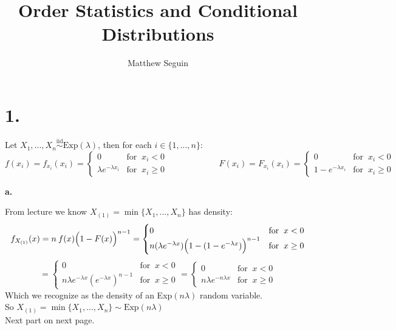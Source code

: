 \documentclass{article}
\title{Order Statistics and Conditional Distributions}
\author{Matthew Seguin}
\date{}
\begin{document}
\maketitle

\section*{1.}
\begin{center}
\doublespacing
    Let $X_1, ..., X_n\overset{\mbox{iid}}{\sim}\mbox{Exp}(\lambda)$, then for each $i\in\{1, ..., n\}$:
    \[f(x_i) = f_{x_i} (x_i) =
    \begin{cases}
        0 & \mbox{for}\;\;x_i < 0 \\
        \lambda e^{-\lambda x_i} & \mbox{for}\;\;x_i\geq 0
    \end{cases}
    \hspace{1in}
    F(x_i) = F_{x_i} (x_i) =
    \begin{cases}
        0 & \mbox{for}\;\;x_i < 0 \\
        1 - e^{-\lambda x_i} & \mbox{for}\;\;x_i\geq 0
    \end{cases}
    \]
\end{center}

{\Large\textbf{a.}}
\begin{center}
\doublespacing
    From lecture we know $X_{(1)} =\min\{X_1, ..., X_n\}$ has density:
    \[f_{X_{(1)}} (x) = n\:f(x)\Big{(}1 - F(x)\Big{)}^{n-1} =
    \begin{cases}
        0 & \mbox{for}\;\;x < 0 \\
        n(\lambda e^{-\lambda x})\Big{(}1 - (1 - e^{-\lambda x})\Big{)}^{n-1} & \mbox{for}\;\;x\geq 0
    \end{cases}
    \]
    \[
    =
    \begin{cases}
        0 & \mbox{for}\;\;x < 0 \\
        n\lambda e^{-\lambda x}(e^{-\lambda x})^{n-1} & \mbox{for}\;\;x\geq 0
    \end{cases}
    =
    \begin{cases}
        0 & \mbox{for}\;\;x < 0 \\
        n\lambda e^{-n\lambda x} & \mbox{for}\;\;x\geq 0
    \end{cases}
    \]
    \break
    Which we recognize as the density of an Exp$(n\lambda)$ random variable.
    \\So $X_{(1)} =\min\{X_1, ..., X_n\}\sim\mbox{Exp}(n\lambda)$ \qedsymbol
    \vspace{2in}
    \\Next part on next page.
\end{center}
\end{document}
